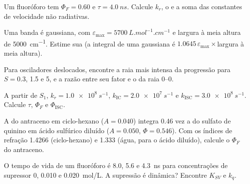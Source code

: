 \begin{exercise}[$\star$]\label{exo:b3:electronic-spectroscopy:4}
Um fluoróforo tem $\Phi_F = 0.60$ e $\tau = \qty{4.0}{ns}$. Calcule $k_r$, o
 e a soma das constantes de velocidade não radiativas.
\end{exercise}

\begin{exercise}[$\star\star$]\label{exo:b3:electronic-spectroscopy:5}
Uma banda é gaussiana, com $\varepsilon_{\max} = \qty{5700}{L.mol^{-1}.cm^{-1}}$ e largura
à meia altura de \qty{5000}{cm^{-1}}. Estime sua  (a integral
de uma gaussiana é $1.0645\,\varepsilon_{\max}\times$largura à meia altura).
\end{exercise}

\begin{exercise}[$\star\star$]\label{exo:b3:electronic-spectroscopy:6}
Para osciladores deslocados, encontre a raia mais intensa da progressão para
$S = 0.3$, 1.5 e 5, e a razão entre seu fator e o da raia 0--0.
\end{exercise}

\begin{exercise}[$\star\star$]\label{exo:b3:electronic-spectroscopy:7}
A partir de $S_1$, $k_r = \qty{1.0e8}{s^{-1}}$, $k_{\mathrm{IC}} = \qty{2.0e7}{s^{-1}}$ e $k_{\mathrm{ISC}} =
\qty{3.0e8}{s^{-1}}$. Calcule $\tau$, $\Phi_F$ e $\Phi_{\mathrm{ISC}}$.
\end{exercise}

\begin{exercise}[$\star\star$]\label{exo:b3:electronic-spectroscopy:8}
A  do antraceno em ciclo-hexano ($A = 0.040$) integra 0.46 vez a
do sulfato de quinino em ácido sulfúrico diluído ($A = 0.050$, $\Phi =
0.546$). Com os índices de refração 1.4266 (ciclo-hexano) e 1.333 (água, para o
ácido diluído), calcule o $\Phi_F$ do antraceno.
\end{exercise}

\begin{exercise}[$\star\star$]\label{exo:b3:electronic-spectroscopy:9}
O tempo de vida de um fluoróforo é 8.0, 5.6 e \qty{4.3}{ns} para concentrações
de supressor 0, 0.010 e \qty{0.020}{mol/L}. A supressão é dinâmica? Encontre
$K_{SV}$ e $k_q$.
\end{exercise}

